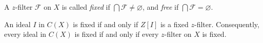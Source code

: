 A \(z\)-filter \(\mathcal{F}\) on \(X\) is called \textit{fixed} if \(\bigcap \mathcal{F} \neq \varnothing\), and \textit{free} if \(\bigcap \mathcal{F} = \varnothing\).

An ideal \(I\) in \(C(X)\) is fixed if and only if \(Z[I]\) is a fixed \(z\)-filter. Consequently, every ideal in \(C(X)\) is fixed if and only if every \(z\)-filter on \(X\) is fixed.
